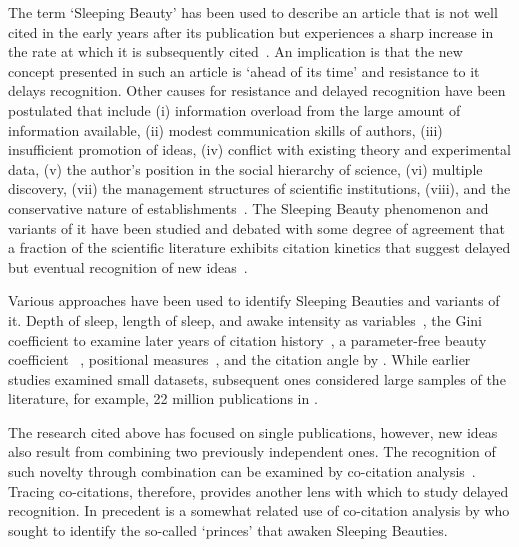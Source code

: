 \documentclass[utf8]{frontiersSCNS}
\begin{document}
The term `Sleeping Beauty' has been used to describe an article that is not well cited in the early years after its publication but experiences a sharp increase in the rate at which it is subsequently cited~\citep{Raan2004}. An implication is that the new concept presented in such an article is `ahead of its time' and resistance to it delays recognition. Other causes for resistance and delayed recognition have been postulated that include (i) information overload from the large amount of information available, (ii)  modest communication skills of authors, (iii) insufficient promotion of ideas, (iv) conflict with existing theory and experimental data, (v) the author's position in the social hierarchy of science, (vi)  multiple discovery, (vii) the management structures of scientific institutions, (viii), and the conservative nature of establishments~\citep{Barber1961,Merton1963,Cole1970,Garfield1970a,Garfield1980a}. The Sleeping Beauty phenomenon and variants of it have been studied and debated with some degree of agreement that a fraction of the scientific literature exhibits citation kinetics that suggest delayed but eventual recognition of new ideas~\citep{Glanzel2003,Glanzel2004,Raan2004,redner_2005,Braun_2010,Li2014,Ke2015,Li2016,Song2018,sugimoto_mostafa_2018,ye_bornmann_2018,Raan2019}. 

Various approaches have been used to identify Sleeping Beauties and variants of it. Depth of sleep, length of sleep, and awake intensity as variables~\citep{Raan2004}, the Gini coefficient to examine later years of citation history~\citep{li_2014}, a parameter-free beauty coefficient ~\citep{Ke2015}, positional measures~\citep{costas2010}, and the citation angle by \cite{ye_bornmann_2018}. While earlier studies examined small datasets, subsequent ones considered large samples of the literature, for example, 22 million publications in \cite{Ke2015}.
	
The research cited above has focused on single publications, however, new ideas also result from combining two previously independent ones. The recognition of such novelty through combination can be examined by co-citation analysis~\citep{MarshakovaShaikevich1973,Small1973,Uzzi2013,Boyack2014,Wang2017,Bradley2020}. Tracing co-citations, therefore, provides another lens with which to study delayed recognition.  In precedent is a somewhat related use of co-citation analysis by \cite{zong_2018,teixeira2017sleeping} who sought to identify the so-called `princes' that awaken Sleeping Beauties. 
\end{document}
